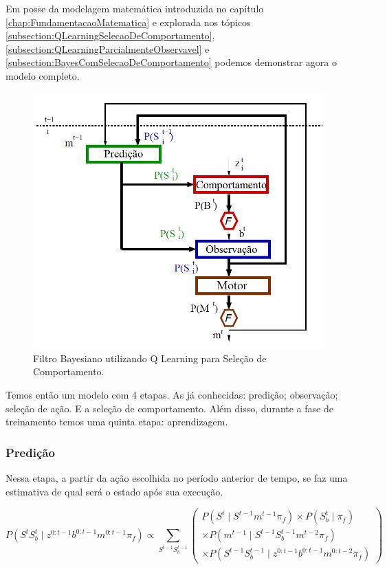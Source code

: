 Em posse da modelagem matemática introduzida no capítulo \ref{chap:FundamentacaoMatematica} e explorada nos tópicos \ref{subsection:QLearningSelecaoDeComportamento}, \ref{subsection:QLearningParcialmenteObservavel} e \ref{subsection:BayesComSelecaoDeComportamento} podemos demonstrar agora o modelo completo.

\begin{figure}[h!]
    \centering
    \includegraphics[width=120mm]{images/modelo_probabilistico-carla}
    \caption{\label{img:ModeloProbabilisticoCarla}Filtro Bayesiano utilizando Q Learning para Seleção de Comportamento.}
\end{figure}

Temos então um modelo com 4 etapas. As já conhecidas: predição; observação; seleção de ação. E a seleção de comportamento. Além disso, durante a fase de treinamento temos uma quinta etapa: aprendizagem.

\subsubsection{Predição} \label{subsubsection:ModeloFinalPredicao}

Nessa etapa, a partir da ação escolhida no período anterior de tempo, se faz uma estimativa de qual será o estado após sua execução.

\begin{equation}
    P \left( S^t S_b^t \mid z^{0: t-1} b^{0: t-1} m^{0: t-1} \pi_f \right) \propto \sum\limits_{S^{t-1} S_b^{t-1}}
        \left(
            \begin{array}{l}
                P \left( S^t \mid S^{t-1} m^{t-1} \pi_f \right) \times P \left( S_b^t \mid \pi_f \right) \\
                \times P \left( m^{t-1} \mid S^{t-1} S_b^{t-1} m^{t-2} \pi_f \right)\\
                \times P \left( S^{t-1} S_b^{t-1} \mid z^{0: t-1} b^{0: t-1} m^{0: t-2} \pi_f \right)
            \end{array}
        \right)
\end{equation}


